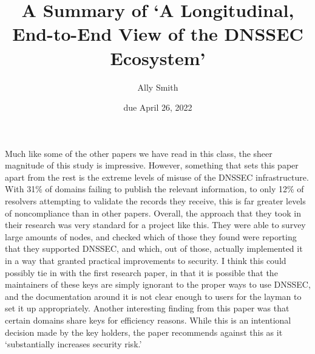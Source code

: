 \documentclass[12pt]{article}
\title{\bf A Summary of `A Longitudinal, End-to-End View of
the DNSSEC Ecosystem'}
\author{Ally Smith}
\date{due April 26, 2022}
\begin{document}
\maketitle{}

Much like some of the other papers we have read in this class, the sheer
magnitude of this study is impressive. However, something that sets this paper
apart from the rest is the extreme levels of misuse of the DNSSEC
infrastructure. With 31\% of domains failing to publish the relevant
information, to only 12\% of resolvers attempting to validate the records they
receive, this is far greater levels of noncompliance than in other papers.
Overall, the approach that they took in their research was very standard for a
project like this. They were able to survey large amounts of nodes, and checked
which of those they found were reporting that they supported DNSSEC, and which,
out of those, actually implemented it in a way that granted practical
improvements to security. I think this could possibly tie in with the first
research paper, in that it is possible that the maintainers of these keys are
simply ignorant to the proper ways to use DNSSEC, and the documentation around
it is not clear enough to users for the layman to set it up appropriately.
Another interesting finding from this paper was that certain domains share keys
for efficiency reasons. While this is an intentional decision made by the key
holders, the paper recommends against this as it `substantially increases
security risk.'
\end{document}
